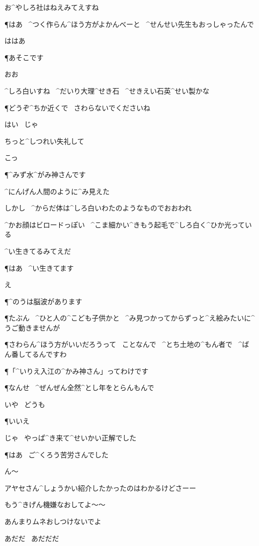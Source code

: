 \Y お^{やしろ}{社}はねえみてえすね

\P はあ
\ ^{つく}{作}らん^{ほう}{方}がよかんべーと
\ ^{せんせい}{先生}もおっしゃったんで

\Y ははあ

\page
\P あそこです

\Y おお

\Y ^{しろ}{白}いすね
\ ^{だいり}{大理}^{せき}{石}
\ ^{せきえい}{石英}^{せい}{製}かな

\P どうぞ^{ちか}{近}くで
\ さわらないでくださいね

\Y はい
\ じゃ

\Y ちっと^{しつれい}{失礼}して

\page[93]
\Y こっ

\P ^{みず}{水}^{がみ}{神}さんです

\page
\Y ^{にんげん}{人間}のように^{み}{見}えた

\Y しかし
\ ^{からだ}{体}は^{しろ}{白}いわたのようなものでおおわれ

\Y ^{かお}{顔}はビロードっぽい
\ ^{こま}{細}かい^{きもう}{起毛}で^{しろ}{白}く^{ひか}{光}っている

\Y ^{い}{生}きてるみてえだ

\P はあ
\ ^{い}{生}きてます

\Y え

\P ^{のうは}{脳波}があります

\page
\P たぶん
\ ^{ひと}{人}の^{こども}{子供}かと
\ ^{み}{見}つかってからずっと^{え}{絵}みたいに^{うご}{動}きませんが

\P さわらん^{ほう}{方}がいいだろうって
\ ことなんで
\ ^{とち}{土地}の^{もん}{者}で
\ ^{ばん}{番}してるんですわ

\P 「^{いりえ}{入江}の^{かみ}{神}さん」ってわけです

\page
\P なんせ
\ ^{ぜんぜん}{全然}^{とし}{年}をとらんもんで

\page
\Y いや
\ どうも

\P いいえ

\Y じゃ
\ やっぱ^{き}{来}て^{せいかい}{正解}でした

\P はあ
\ ご^{くろう}{苦労}さんでした

\Y ん〜

\page
\A アヤセさん^{しょうかい}{紹介}したかったのはわかるけどさーー

\A もう^{きげん}{機嫌}なおしてよ〜〜

\T あんまりムネおしつけないでよ

\T あだだ
\ あだだだ


